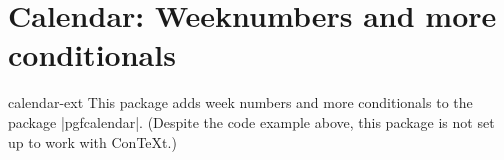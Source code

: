 %
%
%

\section{Calendar: Weeknumbers and more conditionals}
\label{sec:calendar}
\begin{package}{calendar-ext}
  This package adds week numbers and more conditionals to the \pgfname\space package |pgfcalendar|.
  (Despite the code example above, this package is not set up to work with Con\TeX t.)
\end{package}


